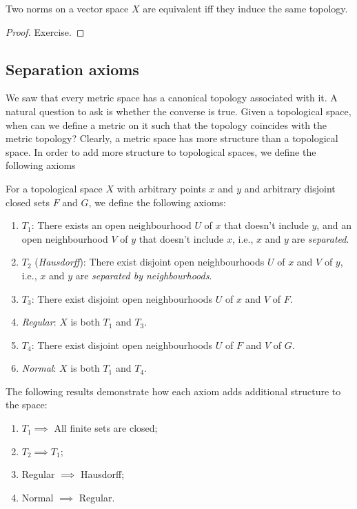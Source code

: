 \begin{thm}
Two norms on a vector space $X$ are equivalent iff they induce the same topology.
\end{thm}
\begin{proof}
Exercise.
\end{proof}

\subsection{Separation axioms} \label{Separation Axioms}

We saw that every metric space has a canonical topology associated with it. A natural question to ask is whether the converse is true. Given a topological space, when can we define a metric on it such that the topology coincides with the metric topology? Clearly, a metric space has more structure than a topological space. In order to add more structure to topological spaces, we define the following axioms

\begin{defn}
For a topological space $X$ with arbitrary points $x$ and $y$ and arbitrary disjoint closed sets $F$ and $G$, we define the following axioms:
\begin{enumerate}
    \item $T_1$: There exists an open neighbourhood $U$ of $x$ that doesn't include $y$, and an open neighbourhood $V$ of $y$ that doesn't include $x$, i.e., $x$ and $y$ are \emph{separated}.
    \item $T_2$ (\emph{Hausdorff}): There exist disjoint open neighbourhoods $U$ of $x$ and $V$ of $y$, i.e., $x$ and $y$ are \emph{separated by neighbourhoods}.
    \item $T_3$: There exist disjoint open neighbourhoods $U$ of $x$ and $V$ of $F$.
    \item \emph{Regular}: $X$ is both $T_1$ and $T_3$.
    \item $T_4$: There exist disjoint open neighbourhoods $U$ of $F$ and $V$ of $G$.
    \item \emph{Normal}: $X$ is both $T_1$ and $T_4$.
\end{enumerate}
\end{defn}

\begin{prop}
The following results demonstrate how each axiom adds additional structure to the space:
\begin{enumerate}
    \item $T_1 \implies$ All finite sets are closed;
    \item $T_2\implies T_1$;
    \item Regular $\implies$ Hausdorff;
    \item Normal $\implies$ Regular.
\end{enumerate}
\end{prop}

